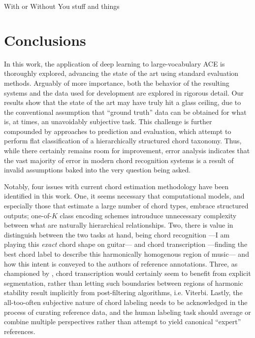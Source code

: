 \documentclass{article}
\begin{document}
With or Without You
stuff and things






\section{Conclusions}

In this work, the application of deep learning to large-vocabulary ACE is thoroughly explored, advancing the state of the art using standard evaluation methods.
Arguably of more importance, both the behavior of the resulting systems and the data used for development are explored in rigorous detail.
Our results show that the state of the art may have truly hit a glass ceiling, due to the conventional assumption that ``ground truth'' data can be obtained for what is, at times, an unavoidably subjective task.
This challenge is further compounded by approaches to prediction and evaluation, which attempt to perform flat classification of a hierarchically structured chord taxonomy.
Thus, while there certainly remains room for improvement, error analysis indicates that the vast majority of error in modern chord recognition systems is a result of invalid assumptions baked into the very question being asked.

Notably, four issues with current chord estimation methodology have been identified in this work.
One, it seems necessary that computational models, and especially those that estimate a large number of chord types, embrace structured outputs;
one-of-$K$ class encoding schemes introuduce unnecessary complexity between what are naturally hierarchical relationships.
Two, there is value in distinguish between the two tasks at hand, being chord recognition ---I am playing this \emph{exact} chord shape on guitar--- and chord transcription ---finding the best chord label to describe this harmonically homogenous region of music--- and how this intent is conveyed to the authors of reference annotations.
Three, as championed by \cite{Mauch}, chord transcription would certainly seem to benefit from explicit segmentation, rather than letting such boundaries between regions of harmonic stability result implicitly from post-filtering algorithms, i.e. Viterbi.
Lastly, the all-too-often subjective nature of chord labeling needs to be acknowledged in the process of curating reference data, and the human labeling task should average or combine multiple perspectives rather than attempt to yield canonical ``expert'' references.
\end{document}
